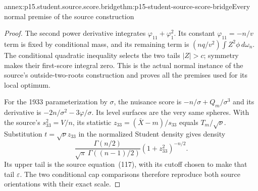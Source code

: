 \begin{annexitem}{annex:p15.student.source.score.bridge}{thm:p15-student-source-score-bridge}{Every normal premise of the source construction}
\begin{proof}
The second power derivative integrates
\(\varphi_{11}+\varphi_1^2\).
Its constant \(\varphi_{11}=-n/v\)
term is fixed by conditional mass,
and its remaining term is
\((nq/v^2)\int Z^2\phi\,d\omega_n\).
The conditional quadratic inequality
selects the two tails \(|Z|>c\);
symmetry makes their first-score
integral zero. This is the actual
normal instance of the source's
outside-two-roots construction and
proves all the premises used for
its local optimum.

For the 1933 parameterization by
\(\sigma\), the nuisance score is
\(-n/\sigma+Q_m/\sigma^3\) and its
derivative is
\(-2n/\sigma^2-3\varphi/\sigma\).
Its level surfaces are the very same
spheres. With the source's
\(s_{33}^2=V/n\), its statistic
\(z_{33}=(\bar X-m)/s_{33}\) equals
\(T_m/\sqrt\nu\). Substitution
\(t=\sqrt\nu z_{33}\) in the normalized
Student density gives density
\[
   \frac{\Gamma(n/2)}
        {\sqrt\pi\,\Gamma((n-1)/2)}
                (1+z_{33}^2)^{-n/2}.
\]
Its upper tail is the source
equation~(117), with its cutoff
chosen to make that tail \(\varepsilon\).
The two conditional cap comparisons
therefore reproduce both source
orientations with their exact scale.
\end{proof}
\end{annexitem}

